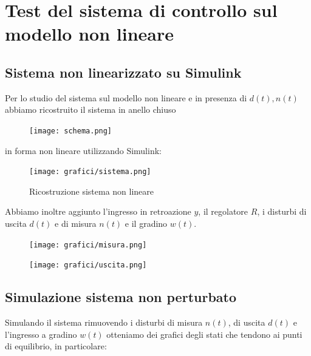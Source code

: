 \documentclass{article}
\begin{document}
\pagebreak


\section{Test del sistema di controllo sul modello non lineare}

\subsection{Sistema non linearizzato su Simulink}
Per lo studio del sistema sul modello non lineare e in presenza di $d(t),n(t)$ abbiamo ricostruito il sistema in anello chiuso

\begin{figure}[!h]
\centering
\texttt{[image: schema.png]}
\end{figure}

\noindent
in forma non lineare utilizzando Simulink:

\begin{figure}[!h]
\centering
\texttt{[image: grafici/sistema.png]}
\caption{\label{fig:orbit}Ricostruzione sistema non lineare}
\end{figure}
\pagebreak
\noindent
Abbiamo inoltre aggiunto l'ingresso in retroazione $y$, il regolatore $R$, i disturbi di uscita $d(t)$ e di misura $n(t)$ e il gradino $w(t)$.
\begin{figure}[!h]
   \begin{minipage}{0.60\textwidth}
     \centering
     \texttt{[image: grafici/misura.png]}
   \end{minipage}\hfill
   \begin{minipage}{0.45\textwidth}
     \centering
     \texttt{[image: grafici/uscita.png]}
   \end{minipage}
\end{figure}

\newpage 
\subsection{Simulazione sistema non perturbato}

Simulando il sistema rimuovendo i disturbi di misura $n(t)$, di uscita $d(t)$ e l'ingresso a gradino $w(t)$ otteniamo dei grafici degli stati che tendono ai punti di equilibrio, in particolare:
\\
\end{document}
